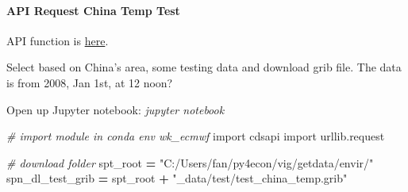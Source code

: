 \documentclass[
]{book}
\newenvironment{Shaded}{\begin{snugshade}}{\end{snugshade}}
\newcommand{\CommentTok}[1]{\textcolor[rgb]{0.56,0.35,0.01}{\textit{#1}}}
\newcommand{\ImportTok}[1]{#1}
\newcommand{\NormalTok}[1]{#1}
\newcommand{\OperatorTok}[1]{\textcolor[rgb]{0.81,0.36,0.00}{\textbf{#1}}}
\newcommand{\StringTok}[1]{\textcolor[rgb]{0.31,0.60,0.02}{#1}}
\begin{document}
\hypertarget{api-request-china-temp-test}{%
\paragraph{API Request China Temp Test}\label{api-request-china-temp-test}}

API function is \href{https://github.com/ecmwf/cdsapi/blob/master/cdsapi/api.py}{here}.

Select based on China's area, some testing data and download grib file. The data is from 2008, Jan 1st, at 12 noon?

Open up Jupyter notebook: \emph{jupyter notebook}

\begin{Shaded}
\begin{Highlighting}[]
\CommentTok{\# import module in conda env wk\_ecmwf}
\ImportTok{import}\NormalTok{ cdsapi}
\ImportTok{import}\NormalTok{ urllib.request}

\CommentTok{\# download folder}
\NormalTok{spt\_root }\OperatorTok{=} \StringTok{"C:/Users/fan/py4econ/vig/getdata/envir/"}
\NormalTok{spn\_dl\_test\_grib }\OperatorTok{=}\NormalTok{ spt\_root }\OperatorTok{+} \StringTok{"\_data/test/test\_china\_temp.grib"}


\end{Highlighting}
\end{Shaded}
\end{document}
